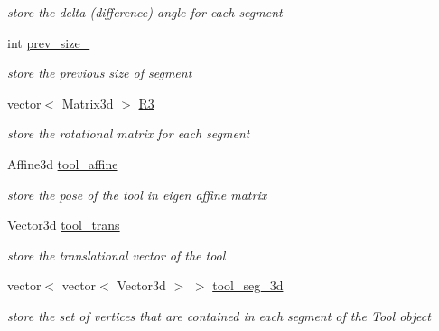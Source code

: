 \begin{DoxyCompactItemize}
\begin{DoxyCompactList}\small\item\em store the delta (difference) angle for each segment \end{DoxyCompactList}\item 
\mbox{\label{classCreate__Tool_aa4242ad29b43cab5ab4d2df4ff44ba9a}} 
int \hyperlink{classCreate__Tool_aa4242ad29b43cab5ab4d2df4ff44ba9a}{prev\+\_\+size\+\_}
\begin{DoxyCompactList}\small\item\em store the previous size of segment \end{DoxyCompactList}\item 
\mbox{\label{classCreate__Tool_adaf26bd4949c41ce06895398ab4fa431}} 
vector$<$ Matrix3d $>$ \hyperlink{classCreate__Tool_adaf26bd4949c41ce06895398ab4fa431}{R3}
\begin{DoxyCompactList}\small\item\em store the rotational matrix for each segment \end{DoxyCompactList}\item 
\mbox{\label{classCreate__Tool_a1d9f7d42a254217cb04a7eb599f0fe0c}} 
Affine3d \hyperlink{classCreate__Tool_a1d9f7d42a254217cb04a7eb599f0fe0c}{tool\+\_\+affine}
\begin{DoxyCompactList}\small\item\em store the pose of the tool in eigen affine matrix \end{DoxyCompactList}\item 
\mbox{\label{classCreate__Tool_a0284095f336cd4847f53a457d1756d1a}} 
Vector3d \hyperlink{classCreate__Tool_a0284095f336cd4847f53a457d1756d1a}{tool\+\_\+trans}
\begin{DoxyCompactList}\small\item\em store the translational vector of the tool \end{DoxyCompactList}\item 
\mbox{\label{classCreate__Tool_a086daeeb01921f90e75e49843f6f56e0}} 
vector$<$ vector$<$ Vector3d $>$ $>$ \hyperlink{classCreate__Tool_a086daeeb01921f90e75e49843f6f56e0}{tool\+\_\+seg\+\_\+3d}
\begin{DoxyCompactList}\small\item\em store the set of vertices that are contained in each segment of the \textquotesingle{}Tool\textquotesingle{} object \end{DoxyCompactList}\item 

\end{DoxyCompactItemize}
